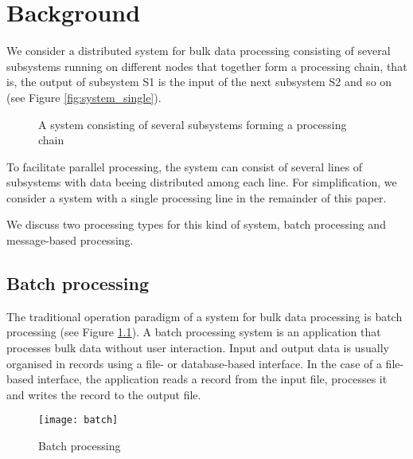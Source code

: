 \chapter{Background}\label{ch:background}
We consider a distributed system for bulk data processing consisting of several subsystems running on different nodes that together form a processing chain, that is, the output of subsystem S1 is the input of the next subsystem S2 and so on (see Figure \ref{fig:system_single}).


\begin{figure}[htbp]
	\centering
	\mbox{}
	\mbox{}
	\caption{A system consisting of several subsystems forming a processing chain}
\end{figure}

To facilitate parallel processing, the system can consist of several lines of subsystems with data beeing distributed among each line. For simplification, we consider a system with a single processing line in the remainder of this paper.

We discuss two processing types for this kind of system, batch processing and message-based processing.

\section{Batch processing}\label{sec:batch_processing}
The traditional operation paradigm of a system for bulk data processing is batch processing (see Figure \ref{fig:batch_processing}). A batch processing system is an application that processes bulk data without user interaction. Input and output data is usually organised in records using a file- or database-based interface. In the case of a file-based interface, the application reads a record from the input file, processes it and writes the record to the output file.
\begin{figure}[htbp]
	\centering
	\texttt{[image: batch]}
	\caption{Batch processing}
	\label{fig:batch_processing}
\end{figure}

